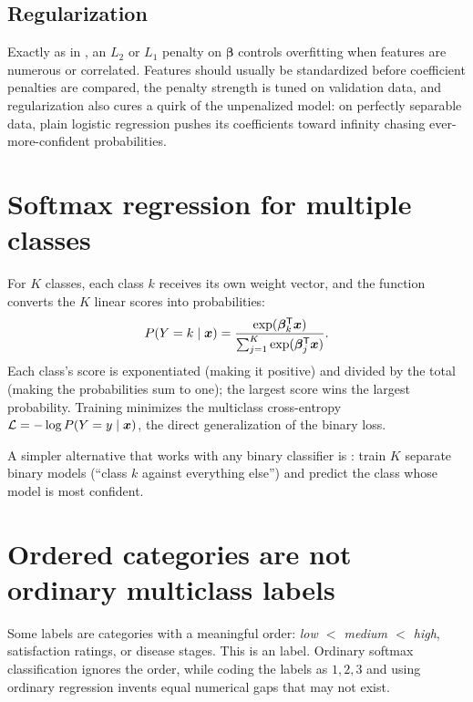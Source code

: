 \subsection{Regularization}

Exactly as in , an $L_2$ or $L_1$ penalty on $\bm{\beta}$ controls overfitting when features are numerous or correlated. Features should usually be standardized before coefficient penalties are compared, the penalty strength is tuned on validation data, and regularization also cures a quirk of the unpenalized model: on perfectly separable data, plain logistic regression pushes its coefficients toward infinity chasing ever-more-confident probabilities.

\section{Softmax regression for multiple classes}

For $K$ classes, each class $k$ receives its own weight vector, and the  function converts the $K$ linear scores into probabilities:
\[
  P(Y=k\mathrel{|}\bm{x})
  =\frac{\exp(\bm{\beta}_k^{\mathsf T}\bm{x})}
        {\sum_{j=1}^{K}\exp(\bm{\beta}_j^{\mathsf T}\bm{x})}.
\]
Each class's score is exponentiated (making it positive) and divided by the total (making the probabilities sum to one); the largest score wins the largest probability. Training minimizes the multiclass cross-entropy $\mathcal{L}=-\log P(Y=y\mathrel{|}\bm{x})$, the direct generalization of the binary loss.

A simpler alternative that works with any binary classifier is : train $K$ separate binary models (``class $k$ against everything else'') and predict the class whose model is most confident.

\section{Ordered categories are not ordinary multiclass labels}
\label{sec:ordinal-labels}

Some labels are categories with a meaningful order: \emph{low $<$ medium $<$ high}, satisfaction ratings, or disease stages. This is an  label. Ordinary softmax classification ignores the order, while coding the labels as $1,2,3$ and using ordinary regression invents equal numerical gaps that may not exist.

